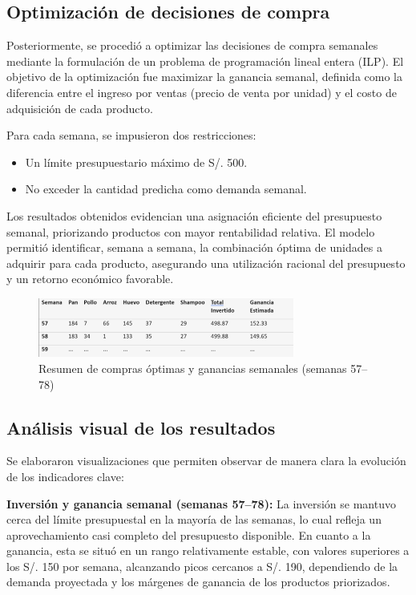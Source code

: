 \documentclass[12pt]{article}
\begin{document}
\subsection{Optimización de decisiones de compra}

Posteriormente, se procedió a optimizar las decisiones de compra semanales mediante la formulación de un problema de programación lineal entera (ILP). El objetivo de la optimización fue maximizar la ganancia semanal, definida como la diferencia entre el ingreso por ventas (precio de venta por unidad) y el costo de adquisición de cada producto.

Para cada semana, se impusieron dos restricciones:
\begin{itemize}
    \item Un límite presupuestario máximo de S/. 500.
    \item No exceder la cantidad predicha como demanda semanal.
\end{itemize}

Los resultados obtenidos evidencian una asignación eficiente del presupuesto semanal, priorizando productos con mayor rentabilidad relativa. El modelo permitió identificar, semana a semana, la combinación óptima de unidades a adquirir para cada producto, asegurando una utilización racional del presupuesto y un retorno económico favorable.


\begin{figure}[H]
    \centering
    \includegraphics[width=0.75\textwidth]{tablaPRED.png}
    \caption{Resumen de compras óptimas y ganancias semanales (semanas 57–78)}
\end{figure}

\subsection{Análisis visual de los resultados}

Se elaboraron visualizaciones que permiten observar de manera clara la evolución de los indicadores clave:

\textbf{Inversión y ganancia semanal (semanas 57–78):} La inversión se mantuvo cerca del límite presupuestal en la mayoría de las semanas, lo cual refleja un aprovechamiento casi completo del presupuesto disponible. En cuanto a la ganancia, esta se situó en un rango relativamente estable, con valores superiores a los S/. 150 por semana, alcanzando picos cercanos a S/. 190, dependiendo de la demanda proyectada y los márgenes de ganancia de los productos priorizados.
\end{document}
